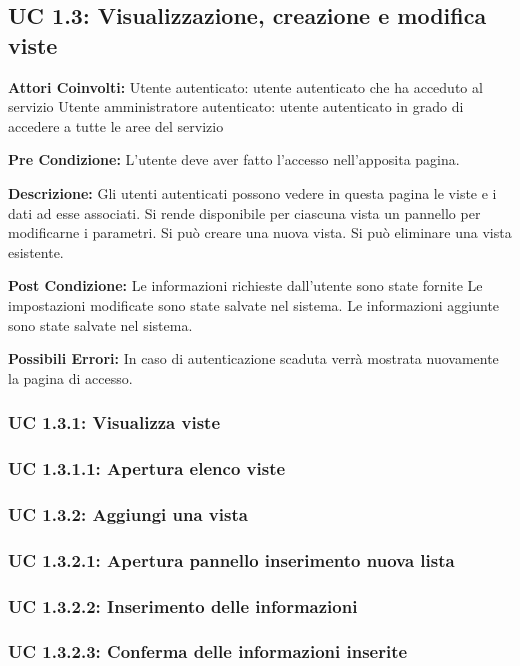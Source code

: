 \subsection{UC 1.3: Visualizzazione, creazione e modifica viste}

\textbf{Attori Coinvolti:}
Utente autenticato: utente autenticato che ha acceduto al servizio
Utente amministratore autenticato: utente autenticato in grado di accedere a tutte le aree del servizio

\textbf{Pre Condizione:}
L’utente deve aver fatto l’accesso nell’apposita pagina.

\textbf{Descrizione:}
Gli utenti autenticati possono vedere in questa pagina le viste e i dati ad esse associati. 
Si rende disponibile per ciascuna vista un pannello per modificarne i parametri. 
Si può creare una nuova vista. 
Si può eliminare una vista esistente.

\textbf{Post Condizione:}
Le informazioni richieste dall’utente sono state fornite
Le impostazioni modificate sono state salvate nel sistema.
Le informazioni aggiunte sono state salvate nel sistema.

\textbf{Possibili Errori:}    
In caso di autenticazione scaduta verrà mostrata nuovamente la pagina di accesso.

\subsubsection{UC 1.3.1: Visualizza viste}
\subsubsection{UC 1.3.1.1: Apertura elenco viste}
\subsubsection{UC 1.3.2: Aggiungi una vista}
\subsubsection{UC 1.3.2.1: Apertura pannello inserimento nuova lista}
\subsubsection{UC 1.3.2.2: Inserimento delle informazioni}
\subsubsection{UC 1.3.2.3: Conferma delle informazioni inserite}
